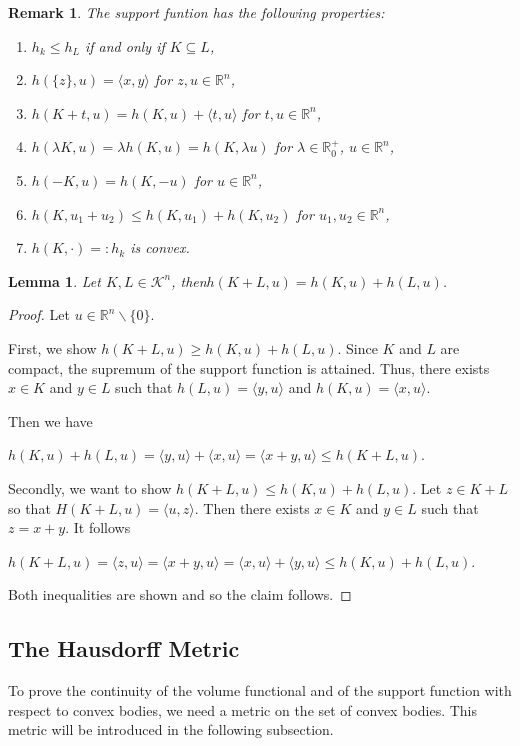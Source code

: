 \documentclass[a4paper]{book}
\newtheorem{lemma}[theorem]{Lemma}%
\newtheorem{remark}[theorem]{Remark}%
\numberwithin{theorem}{section}%
\begin{document}
\begin{remark}
    The support funtion has the following properties:
    \begin{enumerate}
        \item $h_{k}\leq h_{L}$ if and only if $K\subseteq L$,
        \item $h(\{z\},u)=\langle x,y\rangle$ for $z,u\in\mathbb{R}^{n}$,
        \item $h(K+t,u)=h(K,u)+\langle t,u\rangle$ for $t,u\in\mathbb{R}^{n}$,
        \item $h(\lambda K, u)=\lambda h(K,u)=h(K,\lambda u)$ for $\lambda\in\mathbb{R}_{0}^{+}$, $u\in\mathbb{R}^{n}$,
        \item $h(-K,u)=h(K,-u)$ for $u\in\mathbb{R}^{n}$,
        \item $h(K,u_{1}+u_{2})\leq h(K,u_{1})+h(K,u_{2})$ for $u_{1},u_{2}\in\mathbb{R}^{n}$,
        \item $h(K,\cdot)=: h_{k}$ is convex.
    \end{enumerate}
\end{remark}

\begin{lemma}
    Let $K,L\in\mathscr{K}^{n}$, then$h(K+L,u)=h(K,u)+h(L,u)$.
\end{lemma}
\begin{proof}
    Let $u\in\mathbb{R}^{n}\backslash\{0\}$.

    First, we show $h(K+L,u)\geq h(K,u)+h(L,u)$. Since $K$ and $L$ are compact, the supremum of the support function is attained. Thus, there exists $x\in K$ and $y\in L$ such that $h(L,u)=\langle y,u\rangle$ and $h(K,u)=\langle x,u\rangle$.

    Then we have
    \begin{center}
        $h(K,u)+h(L,u)=\langle y,u\rangle+\langle x,u\rangle=\langle x+y,u\rangle\leq h(K+L,u)$.
    \end{center}

    Secondly, we want to show $h(K+L,u)\leq h(K,u)+h(L,u)$. Let $z\in K+L$ so that $H(K+L,u)=\langle u,z\rangle$. Then there exists $x\in K$ and $y\in L$ such that $z=x+y$. It follows
    \begin{center}
        $h(K+L,u)=\langle z,u\rangle=\langle x+y,u\rangle=\langle x,u\rangle+\langle y,u\rangle\leq h(K,u)+h(L,u)$.
    \end{center}
    Both inequalities are shown and so the claim follows.
\end{proof}

\subsection{The Hausdorff Metric}
To prove the continuity of the volume functional and of the support function with respect to convex bodies, we need a metric on the set of convex bodies. This metric will be introduced in the following subsection.
\end{document}
